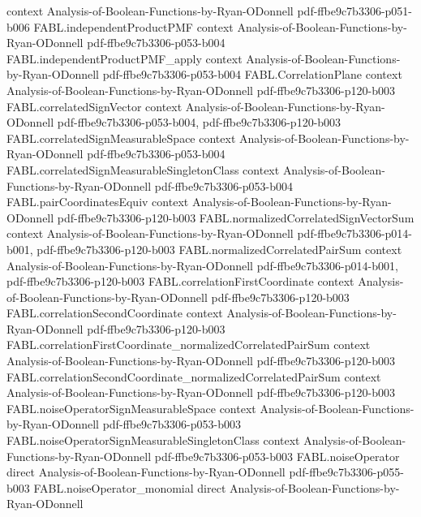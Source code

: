 \begin{theorem}
  {context}
  {Analysis-of-Boolean-Functions-by-Ryan-ODonnell}
  {pdf-ffbe9c7b3306-p051-b006}
\proofstep
  {FABL.independentProductPMF}
  {context}
  {Analysis-of-Boolean-Functions-by-Ryan-ODonnell}
  {pdf-ffbe9c7b3306-p053-b004}
\proofstep
  {FABL.independentProductPMF_apply}
  {context}
  {Analysis-of-Boolean-Functions-by-Ryan-ODonnell}
  {pdf-ffbe9c7b3306-p053-b004}
\proofstep
  {FABL.CorrelationPlane}
  {context}
  {Analysis-of-Boolean-Functions-by-Ryan-ODonnell}
  {pdf-ffbe9c7b3306-p120-b003}
\proofstep
  {FABL.correlatedSignVector}
  {context}
  {Analysis-of-Boolean-Functions-by-Ryan-ODonnell}
  {pdf-ffbe9c7b3306-p053-b004,
    pdf-ffbe9c7b3306-p120-b003}
\proofstep
  {FABL.correlatedSignMeasurableSpace}
  {context}
  {Analysis-of-Boolean-Functions-by-Ryan-ODonnell}
  {pdf-ffbe9c7b3306-p053-b004}
\proofstep
  {FABL.correlatedSignMeasurableSingletonClass}
  {context}
  {Analysis-of-Boolean-Functions-by-Ryan-ODonnell}
  {pdf-ffbe9c7b3306-p053-b004}
\proofstep
  {FABL.pairCoordinatesEquiv}
  {context}
  {Analysis-of-Boolean-Functions-by-Ryan-ODonnell}
  {pdf-ffbe9c7b3306-p120-b003}
\proofstep
  {FABL.normalizedCorrelatedSignVectorSum}
  {context}
  {Analysis-of-Boolean-Functions-by-Ryan-ODonnell}
  {pdf-ffbe9c7b3306-p014-b001,
    pdf-ffbe9c7b3306-p120-b003}
\proofstep
  {FABL.normalizedCorrelatedPairSum}
  {context}
  {Analysis-of-Boolean-Functions-by-Ryan-ODonnell}
  {pdf-ffbe9c7b3306-p014-b001,
    pdf-ffbe9c7b3306-p120-b003}
\proofstep
  {FABL.correlationFirstCoordinate}
  {context}
  {Analysis-of-Boolean-Functions-by-Ryan-ODonnell}
  {pdf-ffbe9c7b3306-p120-b003}
\proofstep
  {FABL.correlationSecondCoordinate}
  {context}
  {Analysis-of-Boolean-Functions-by-Ryan-ODonnell}
  {pdf-ffbe9c7b3306-p120-b003}
\proofstep
  {FABL.correlationFirstCoordinate_normalizedCorrelatedPairSum}
  {context}
  {Analysis-of-Boolean-Functions-by-Ryan-ODonnell}
  {pdf-ffbe9c7b3306-p120-b003}
\proofstep
  {FABL.correlationSecondCoordinate_normalizedCorrelatedPairSum}
  {context}
  {Analysis-of-Boolean-Functions-by-Ryan-ODonnell}
  {pdf-ffbe9c7b3306-p120-b003}
\proofstep
  {FABL.noiseOperatorSignMeasurableSpace}
  {context}
  {Analysis-of-Boolean-Functions-by-Ryan-ODonnell}
  {pdf-ffbe9c7b3306-p053-b003}
\proofstep
  {FABL.noiseOperatorSignMeasurableSingletonClass}
  {context}
  {Analysis-of-Boolean-Functions-by-Ryan-ODonnell}
  {pdf-ffbe9c7b3306-p053-b003}
\proofstep
  {FABL.noiseOperator}
  {direct}
  {Analysis-of-Boolean-Functions-by-Ryan-ODonnell}
  {pdf-ffbe9c7b3306-p055-b003}
\proofstep
  {FABL.noiseOperator_monomial}
  {direct}
  {Analysis-of-Boolean-Functions-by-Ryan-ODonnell}

\end{theorem}
